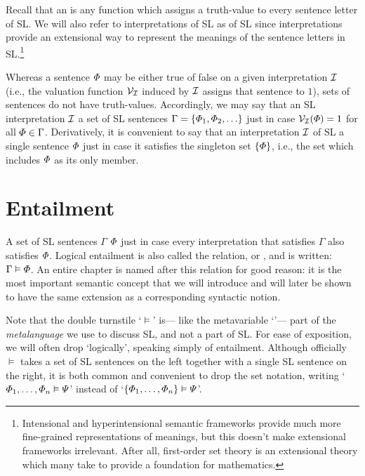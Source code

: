 Recall that an  is any function which assigns a truth-value to every sentence letter of SL.
We will also refer to interpretations of SL as  of SL since interpretations provide an extensional way to represent the meanings of the sentence letters in SL.\footnote{Intensional and hyperintensional semantic frameworks provide much more fine-grained representations of meanings, but this doesn't make extensional frameworks irrelevant. After all, first-order set theory is an extensional theory which many take to provide a foundation for mathematics.}

Whereas a sentence $\varPhi{}$ may be either true of false on a given interpretation $\mathcal{I}$ (i.e., the valuation function $\mathcal{V}_{\mathcal{I}}$ induced by $\mathcal{I}$ assigns that sentence to $1$), sets of sentences do not have truth-values.
Accordingly, we may say that an SL interpretation $\mathcal{I}$  a set of SL sentences $\Gamma=\lbrace\varPhi_{1},\varPhi_{2},\ldots\rbrace$ just in case $\mathcal{V}_{\mathcal{I}}(\varPhi)=1$ for all $\varPhi \in \Gamma$.
Derivatively, it is convenient to say that an interpretation $\mathcal{I}$ of SL  a single sentence $\varPhi$ just in case it satisfies the singleton set $\lbrace\varPhi\rbrace$, i.e., the set which includes $\varPhi$ as its only member. 





\section{Entailment}
  \label{sec:entailment}

A set of SL sentences $\Gamma$  $\varPhi$ just in case every interpretation that satisfies $\Gamma$ also satisfies $\varPhi$.
Logical entailment is also called the  relation, or , and is written: $\Gamma \vDash \varPhi$. 
An entire chapter is named after this relation for good reason: it is the most important semantic concept that we will introduce and will later be shown to have the same extension as a corresponding syntactic notion.

Note that the double turnstile `$\models$' is--- like the metavariable `\metaA{}'--- part of the \emph{metalanguage} we use to discuss SL, and not a part of SL.
For ease of exposition, we will often drop `logically', speaking simply of entailment.
Although officially $\models$ takes a set of SL sentences on the left together with a single SL sentence on the right, it is both common and convenient to drop the set notation, writing `$\varPhi_1,\ldots,\varPhi_n \vDash \varPsi$' instead of `$\lbrace\varPhi_1,\ldots,\varPhi_n\rbrace \vDash \varPsi$'.

